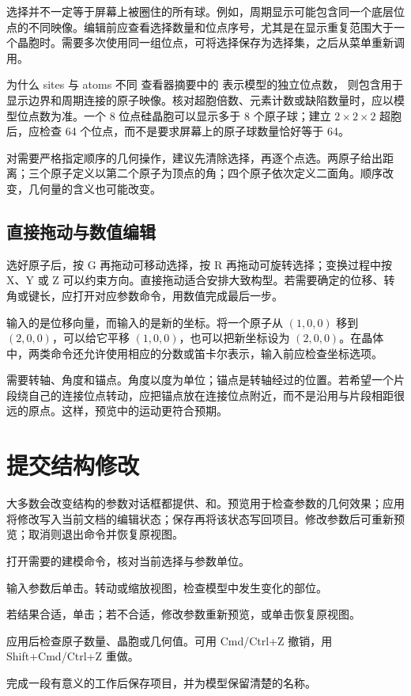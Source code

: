 选择并不一定等于屏幕上被圈住的所有球。例如，周期显示可能包含同一个底层位点的不同映像。编辑前应查看选择数量和位点序号，尤其是在显示重复范围大于一个晶胞时。需要多次使用同一组位点，可将选择保存为选择集，之后从菜单重新调用。

\begin{notebox}{为什么 sites 与 atoms 不同}
查看器摘要中的  表示模型的独立位点数， 则包含用于显示边界和周期连接的原子映像。核对超胞倍数、元素计数或缺陷数量时，应以模型位点数为准。一个 8 位点硅晶胞可以显示多于 8 个原子球；建立 $2\times2\times2$ 超胞后，应检查 64 个位点，而不是要求屏幕上的原子球数量恰好等于 64。
\end{notebox}



对需要严格指定顺序的几何操作，建议先清除选择，再逐个点选。两原子给出距离；三个原子定义以第二个原子为顶点的角；四个原子依次定义二面角。顺序改变，几何量的含义也可能改变。

\subsection{直接拖动与数值编辑}

选好原子后，按 G 再拖动可移动选择，按 R 再拖动可旋转选择；变换过程中按 X、Y 或 Z 可以约束方向。直接拖动适合安排大致构型。若需要确定的位移、转角或键长，应打开对应参数命令，用数值完成最后一步。

输入的是位移向量，而输入的是新的坐标。将一个原子从 $(1,0,0)$ 移到 $(2,0,0)$，可以给它平移 $(1,0,0)$，也可以把新坐标设为 $(2,0,0)$。在晶体中，两类命令还允许使用相应的分数或笛卡尔表示，输入前应检查坐标选项。

需要转轴、角度和锚点。角度以度为单位；锚点是转轴经过的位置。若希望一个片段绕自己的连接位点转动，应把锚点放在连接位点附近，而不是沿用与片段相距很远的原点。这样，预览中的运动更符合预期。

\section{提交结构修改}

大多数会改变结构的参数对话框都提供、和。预览用于检查参数的几何效果；应用将修改写入当前文档的编辑状态；保存再将该状态写回项目。修改参数后可重新预览；取消则退出命令并恢复原视图。

\begin{steps}
  \item 打开需要的建模命令，核对当前选择与参数单位。
  \item 输入参数后单击。转动或缩放视图，检查模型中发生变化的部位。
  \item 若结果合适，单击；若不合适，修改参数重新预览，或单击恢复原视图。
  \item 应用后检查原子数量、晶胞或几何值。可用 Cmd/Ctrl+Z 撤销，用 Shift+Cmd/Ctrl+Z 重做。
  \item 完成一段有意义的工作后保存项目，并为模型保留清楚的名称。
\end{steps}

